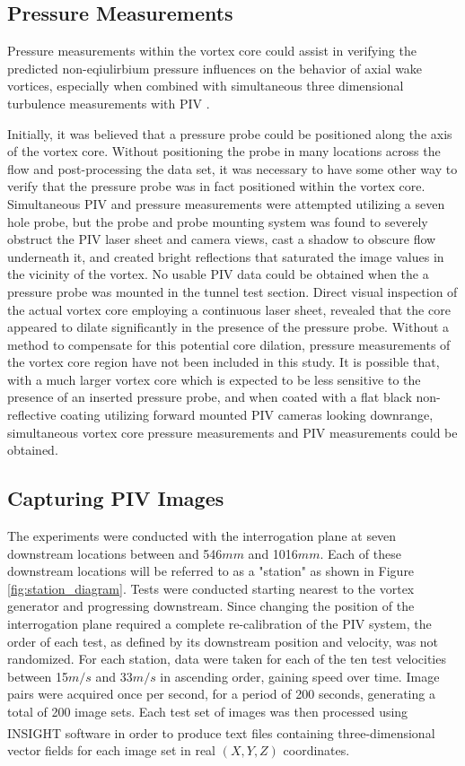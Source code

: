 \subsection{Pressure Measurements}

Pressure measurements within the vortex core could assist in verifying the 
predicted non-eqiulirbium pressure influences on the behavior of axial wake 
vortices, especially when combined with simultaneous three dimensional 
turbulence measurements with PIV \cite{ash2011}.


Initially, it was believed that a pressure probe could be positioned 
along the axis of the vortex core. Without positioning the probe in many 
locations across the flow and post-processing the data set, it was necessary to 
have some other way to verify that the pressure probe was in fact positioned 
within the vortex core. Simultaneous PIV and pressure measurements were 
attempted utilizing a seven hole probe, but the probe and probe mounting system 
was found to severely obstruct the PIV laser sheet and camera views, cast a 
shadow to obscure flow underneath it, and 
created bright reflections that saturated the image values in the vicinity of 
the vortex. No usable PIV data could be obtained when the a pressure probe was 
mounted in the tunnel test section. Direct visual inspection of the actual 
vortex core employing a continuous laser sheet, revealed that the core appeared 
to dilate significantly in the presence of the pressure probe. Without a method 
to compensate for this potential core dilation, pressure measurements of the 
vortex core region have not been included in this study. It is possible that, 
with a much larger vortex core which is expected to be less 
sensitive to the presence of an inserted pressure probe, and when coated with 
a flat black non-reflective coating utilizing forward mounted PIV cameras 
looking downrange, simultaneous vortex core pressure measurements and PIV 
measurements could be obtained.

\subsection{Capturing PIV Images}

The experiments were conducted with the interrogation plane at seven 
downstream  locations between and 546$mm$ and 1016$mm$. Each of these 
downstream locations will be referred to as a "station" as shown in Figure 
\ref{fig:station_diagram}. Tests were conducted 
starting nearest to the vortex 
generator and progressing downstream. Since changing the position of the 
interrogation plane required a complete re-calibration of the PIV system, the 
order of each test, as defined by its downstream position and velocity, was not 
randomized. For each station, data were taken for each of 
the ten test velocities between 15$m/s$ and 33$m/s$ in ascending order, gaining 
speed over time. Image pairs were acquired once per second, for a period of 200 
seconds, generating a total of 200 image sets. Each test set of images was then 
processed using INSIGHT\textsuperscript{\textcopyright} software in 
order to produce text files containing three-dimensional vector fields for each 
image set in real $(X, Y, Z)$ coordinates.

